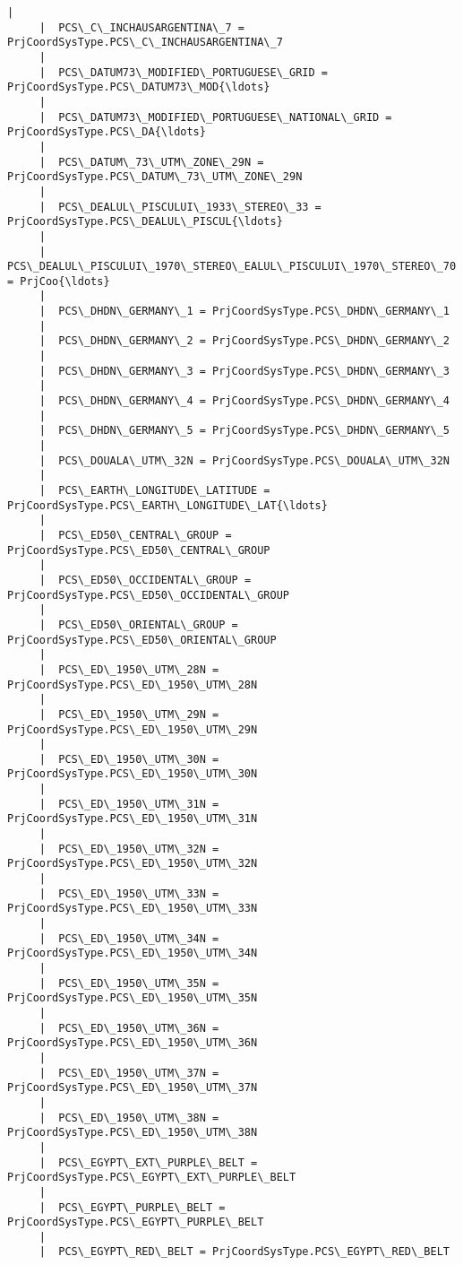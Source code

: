 \documentclass[11pt]{article}
\begin{document}
\begin{Verbatim}[commandchars=\\\{\}]
     |  
     |  PCS\_C\_INCHAUSARGENTINA\_7 = PrjCoordSysType.PCS\_C\_INCHAUSARGENTINA\_7
     |  
     |  PCS\_DATUM73\_MODIFIED\_PORTUGUESE\_GRID = PrjCoordSysType.PCS\_DATUM73\_MOD{\ldots}
     |  
     |  PCS\_DATUM73\_MODIFIED\_PORTUGUESE\_NATIONAL\_GRID = PrjCoordSysType.PCS\_DA{\ldots}
     |  
     |  PCS\_DATUM\_73\_UTM\_ZONE\_29N = PrjCoordSysType.PCS\_DATUM\_73\_UTM\_ZONE\_29N
     |  
     |  PCS\_DEALUL\_PISCULUI\_1933\_STEREO\_33 = PrjCoordSysType.PCS\_DEALUL\_PISCUL{\ldots}
     |  
     |  PCS\_DEALUL\_PISCULUI\_1970\_STEREO\_EALUL\_PISCULUI\_1970\_STEREO\_70 = PrjCoo{\ldots}
     |  
     |  PCS\_DHDN\_GERMANY\_1 = PrjCoordSysType.PCS\_DHDN\_GERMANY\_1
     |  
     |  PCS\_DHDN\_GERMANY\_2 = PrjCoordSysType.PCS\_DHDN\_GERMANY\_2
     |  
     |  PCS\_DHDN\_GERMANY\_3 = PrjCoordSysType.PCS\_DHDN\_GERMANY\_3
     |  
     |  PCS\_DHDN\_GERMANY\_4 = PrjCoordSysType.PCS\_DHDN\_GERMANY\_4
     |  
     |  PCS\_DHDN\_GERMANY\_5 = PrjCoordSysType.PCS\_DHDN\_GERMANY\_5
     |  
     |  PCS\_DOUALA\_UTM\_32N = PrjCoordSysType.PCS\_DOUALA\_UTM\_32N
     |  
     |  PCS\_EARTH\_LONGITUDE\_LATITUDE = PrjCoordSysType.PCS\_EARTH\_LONGITUDE\_LAT{\ldots}
     |  
     |  PCS\_ED50\_CENTRAL\_GROUP = PrjCoordSysType.PCS\_ED50\_CENTRAL\_GROUP
     |  
     |  PCS\_ED50\_OCCIDENTAL\_GROUP = PrjCoordSysType.PCS\_ED50\_OCCIDENTAL\_GROUP
     |  
     |  PCS\_ED50\_ORIENTAL\_GROUP = PrjCoordSysType.PCS\_ED50\_ORIENTAL\_GROUP
     |  
     |  PCS\_ED\_1950\_UTM\_28N = PrjCoordSysType.PCS\_ED\_1950\_UTM\_28N
     |  
     |  PCS\_ED\_1950\_UTM\_29N = PrjCoordSysType.PCS\_ED\_1950\_UTM\_29N
     |  
     |  PCS\_ED\_1950\_UTM\_30N = PrjCoordSysType.PCS\_ED\_1950\_UTM\_30N
     |  
     |  PCS\_ED\_1950\_UTM\_31N = PrjCoordSysType.PCS\_ED\_1950\_UTM\_31N
     |  
     |  PCS\_ED\_1950\_UTM\_32N = PrjCoordSysType.PCS\_ED\_1950\_UTM\_32N
     |  
     |  PCS\_ED\_1950\_UTM\_33N = PrjCoordSysType.PCS\_ED\_1950\_UTM\_33N
     |  
     |  PCS\_ED\_1950\_UTM\_34N = PrjCoordSysType.PCS\_ED\_1950\_UTM\_34N
     |  
     |  PCS\_ED\_1950\_UTM\_35N = PrjCoordSysType.PCS\_ED\_1950\_UTM\_35N
     |  
     |  PCS\_ED\_1950\_UTM\_36N = PrjCoordSysType.PCS\_ED\_1950\_UTM\_36N
     |  
     |  PCS\_ED\_1950\_UTM\_37N = PrjCoordSysType.PCS\_ED\_1950\_UTM\_37N
     |  
     |  PCS\_ED\_1950\_UTM\_38N = PrjCoordSysType.PCS\_ED\_1950\_UTM\_38N
     |  
     |  PCS\_EGYPT\_EXT\_PURPLE\_BELT = PrjCoordSysType.PCS\_EGYPT\_EXT\_PURPLE\_BELT
     |  
     |  PCS\_EGYPT\_PURPLE\_BELT = PrjCoordSysType.PCS\_EGYPT\_PURPLE\_BELT
     |  
     |  PCS\_EGYPT\_RED\_BELT = PrjCoordSysType.PCS\_EGYPT\_RED\_BELT

\end{Verbatim}
\end{document}
